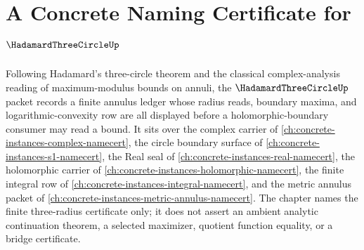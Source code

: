 \chapter{A Concrete Naming Certificate for $\HadamardThreeCircleUp$}
\label{ch:concrete-instances-hadamard-three-circle-namecert}

Following Hadamard's three-circle theorem and the classical complex-analysis reading of maximum-modulus bounds on annuli, the $\HadamardThreeCircleUp$ packet records a finite annulus ledger whose radius reads, boundary maxima, and logarithmic-convexity row are all displayed before a holomorphic-boundary consumer may read a bound. It sits over the complex carrier of \autoref{ch:concrete-instances-complex-namecert}, the circle boundary surface of \autoref{ch:concrete-instances-s1-namecert}, the Real seal of \autoref{ch:concrete-instances-real-namecert}, the holomorphic carrier of \autoref{ch:concrete-instances-holomorphic-namecert}, the finite integral row of \autoref{ch:concrete-instances-integral-namecert}, and the metric annulus packet of \autoref{ch:concrete-instances-metric-annulus-namecert}. The chapter names the finite three-radius certificate only; it does not assert an ambient analytic continuation theorem, a selected maximizer, quotient function equality, or a bridge certificate.

